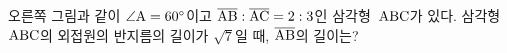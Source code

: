 \noindent\begin{minipage}[t]{0.58\linewidth}\vspace{0pt}\raggedright 오른쪽 그림과 같이 $\angle\mathrm{A}=60^\circ$이고 $\overline{\mathrm{AB}}:\overline{\mathrm{AC}}=2:3$인 삼각형~$\mathrm{ABC}$가 있다. 삼각형~$\mathrm{ABC}$의 외접원의 반지름의 길이가 $\sqrt{7}$일 때, $\overline{\mathrm{AB}}$의 길이는?\end{minipage}\hfill\begin{minipage}[t]{0.4\linewidth}\vspace{0pt}\centering \resizebox{\ifdim\width>\linewidth\linewidth\else\width\fi}{!}{}\end{minipage}\par
{}
